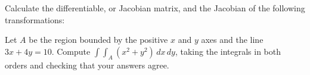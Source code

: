 
\setcounter{question}{64}
\question Calculate the differentiable, or Jacobian matrix,
and the Jacobian of the following transformations:

\setcounter{question}{67}
\question Let $A$ be the region bounded by the positive $x$ and $y$ axes and the line
$3x + 4y = 10$.
Compute $\int\int_A (x^2 + y^2) \,dx\,dy$,
taking the integrals in both orders and checking that your answers agree.
